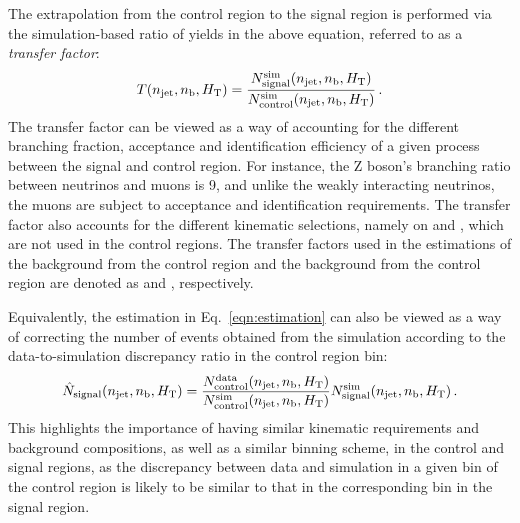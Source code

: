 The extrapolation from the control region to the signal region is performed via 
the simulation-based ratio of yields in the above equation, referred to as a 
\textit{transfer factor}:
\begin{equation}
T(n_{\text{jet}}, n_{\text{b}}, \mbox{$H_\text{T}$})  = 
\frac{N_\mathrm{signal}^\mathrm{sim}(n_{\text{jet}}, n_{\text{b}}, \mbox{$H_\text{T}$})}{N_\mathrm{control}^\mathrm{sim}(n_{\text{jet}}, n_{\text{b}}, \mbox{$H_\text{T}$})}
 \, .
\end{equation}
The transfer factor can be viewed as a way of accounting for the different 
branching fraction, acceptance and identification efficiency of a given process 
between the signal and control region. For instance, the Z boson's branching 
ratio between neutrinos and muons is 9, and unlike the weakly interacting 
neutrinos, the muons are subject to acceptance and identification requirements. 
The transfer factor also accounts for the different kinematic selections, 
namely on \alphat and \bdphi, which are not used in the control regions. 
The transfer factors used in the estimations of the \ttw background from the 
\mj control region and the \znnj background from the \mmj control region are 
denoted as \Tmutottw and \Tmumutoz, respectively.


Equivalently, the estimation in Eq.~\ref{eqn:estimation} can also be viewed as 
a way of correcting the number of events obtained from the simulation according 
to the data-to-simulation discrepancy ratio in the control region bin:
\begin{equation}
\label{eqn:estimation2}
\hat{N}_\mathrm{signal}(n_{\text{jet}}, n_{\text{b}}, \mbox{$H_\text{T}$}) = 
\frac{N_\mathrm{control}^\mathrm{data}(n_{\text{jet}}, n_{\text{b}}, \mbox{$H_\text{T}$})}{N_\mathrm{control}^\mathrm{sim}(n_{\text{jet}}, n_{\text{b}}, \mbox{$H_\text{T}$})}
N_\mathrm{signal}^\mathrm{sim}(n_{\text{jet}}, n_{\text{b}}, \mbox{$H_\text{T}$}) \, .
\end{equation}
This highlights the importance of having similar kinematic requirements and 
background compositions, as well as a similar binning scheme, in the control 
and signal regions, as the discrepancy between data and simulation in a given 
bin of the control region is likely to be similar to that in the corresponding 
bin in the signal region.

